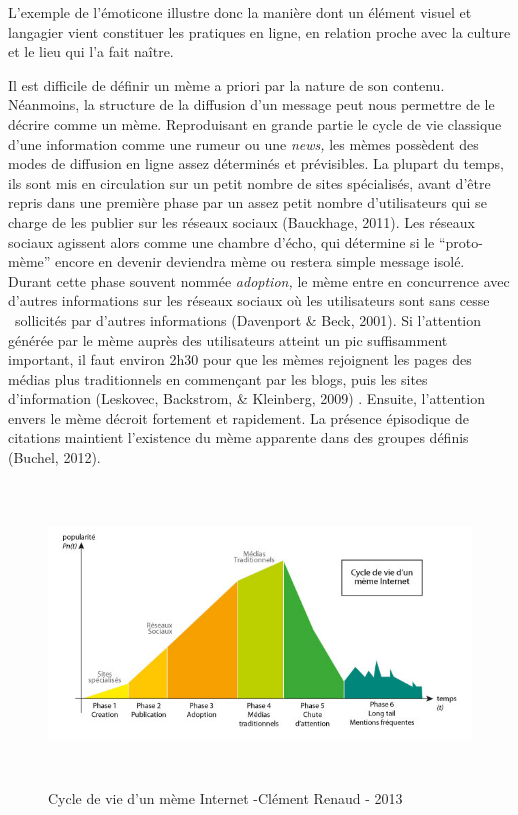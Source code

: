 L{\textquoteright}exemple de l{\textquoteright}\'emoticone illustre donc la mani\`ere dont un \'el\'ement visuel et langagier vient constituer les pratiques en ligne, en relation proche avec la culture et le lieu qui l{\textquoteright}a fait na\^itre. 

Il est difficile de d\'efinir un m\`eme a priori par la nature de son contenu. N\'eanmoins, la structure de la diffusion d{\textquoteright}un message peut nous permettre de le d\'ecrire comme un m\`eme. Reproduisant en grande partie le cycle de vie classique d{\textquoteright}une information comme une rumeur ou une \textit{news, }les m\`emes poss\`edent des modes de diffusion en ligne assez d\'etermin\'es et pr\'evisibles. La plupart du temps, ils sont mis en circulation sur un petit nombre de sites sp\'ecialis\'es, avant d{\textquoteright}\^etre repris dans une premi\`ere phase par un assez petit nombre d{\textquoteright}utilisateurs qui se charge de les publier sur les r\'eseaux sociaux (Bauckhage, 2011). Les r\'eseaux sociaux agissent alors comme une chambre d{\textquoteright}\'echo, qui d\'etermine si le {\textquotedblleft}proto-m\`eme{\textquotedblright} encore en devenir deviendra m\`eme ou restera simple message isol\'e. Durant cette phase souvent nomm\'ee \textit{adoption,} le m\`eme entre en concurrence avec d{\textquoteright}autres informations sur les r\'eseaux sociaux o\`u les utilisateurs sont sans cesse \ sollicit\'es par d{\textquoteright}autres informations (Davenport \& Beck, 2001). Si l{\textquoteright}attention g\'en\'er\'ee par le m\`eme aupr\`es des utilisateurs atteint un pic suffisamment important, il faut environ 2h30 pour que les m\`emes rejoignent les pages des m\'edias plus traditionnels en commen\c{c}ant par les blogs, puis les sites d{\textquoteright}information (Leskovec, Backstrom, \& Kleinberg, 2009) . Ensuite, l{\textquoteright}attention envers le m\`eme d\'ecroit fortement et rapidement. La pr\'esence \'episodique de citations maintient l{\textquoteright}existence du m\`eme apparente dans des groupes d\'efinis (Buchel, 2012).

\begin{figure}[h]
    \centering
    \includegraphics[width=6.2559in,height=3.1559in]{figures/chap2/chapitre2-img2.jpg}
    \caption[Cycle de vie d{\textquoteright}un m\`eme Internet]{Cycle de vie d{\textquoteright}un m\`eme Internet -Cl\'ement Renaud - 2013}
    \label{fig:meme-lifecycle}
\end{figure}

